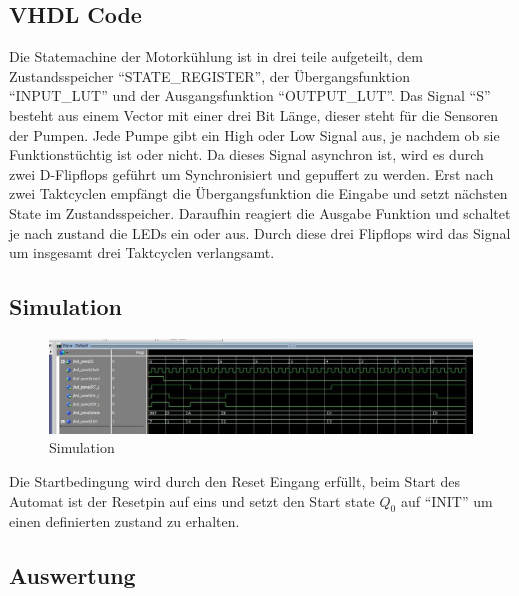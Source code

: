\subsection{VHDL Code}
 Die Statemachine der Motorkühlung ist in drei teile aufgeteilt, dem Zustandsspeicher ``STATE\_REGISTER'', der Übergangsfunktion ``INPUT\_LUT'' und der Ausgangsfunktion ``OUTPUT\_LUT''. Das Signal ``S'' besteht aus einem Vector mit einer drei Bit Länge, dieser steht für die Sensoren der Pumpen. Jede Pumpe gibt ein High oder Low Signal aus, je nachdem ob sie  Funktionstüchtig ist oder nicht. Da dieses Signal  asynchron ist, wird es durch zwei D-Flipflops geführt um Synchronisiert und gepuffert zu werden. Erst nach zwei Taktcyclen empfängt die Übergangsfunktion die Eingabe und setzt nächsten State im Zustandsspeicher. Daraufhin reagiert die Ausgabe Funktion und schaltet je nach zustand die LEDs ein oder aus. Durch diese drei Flipflops wird das Signal um insgesamt drei Taktcyclen verlangsamt.
 



\subsection{Simulation}


\begin{figure}[H]
    \begin{center}
        \includegraphics[width=1\textwidth]{img/motorsim.jpg}
        \caption{Simulation}
        \label{fig:A1_sim}
    \end{center}
\end{figure}

Die Startbedingung wird durch den Reset Eingang erfüllt, beim Start des Automat ist der Resetpin auf eins und setzt den Start state $Q_0$ auf ``INIT'' um einen definierten zustand zu erhalten.

\subsection{Auswertung}
